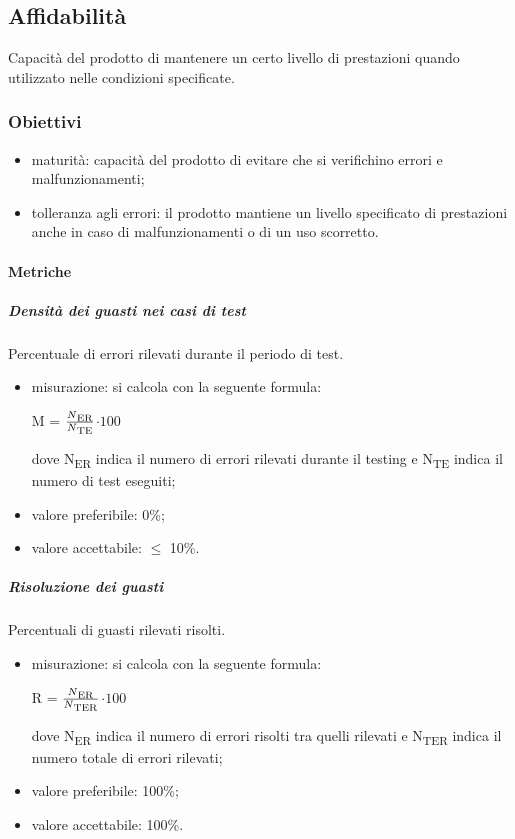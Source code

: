 	\subsection{Affidabilità}
	Capacità del prodotto di mantenere un certo livello di prestazioni quando utilizzato nelle condizioni specificate.
		\subsubsection{Obiettivi}
		\begin{itemize}
			\item maturità: capacità del prodotto di evitare che si verifichino errori e malfunzionamenti;
			\item tolleranza agli errori: il prodotto mantiene un livello specificato di prestazioni anche in caso di malfunzionamenti o di un uso scorretto.
		\end{itemize}
		\paragraph{Metriche}
			\subparagraph{Densità dei guasti nei casi di test}
			Percentuale di errori rilevati durante il periodo di test.
			\begin{itemize}
			\item misurazione: si calcola con la seguente formula: \\
			\centerline{ M =  \(\frac{N\textsubscript{ER}}{N\textsubscript{TE}} \)$ \cdot 100$ }
			dove N\textsubscript{ER} indica il numero di errori rilevati durante il testing e N\textsubscript{TE} indica il numero di test eseguiti;
			\item valore preferibile: 0\%;
			\item valore accettabile: $\leq$ 10\%.
			\end{itemize}
			\subparagraph{Risoluzione dei guasti}
			Percentuali di guasti rilevati risolti.
			\begin{itemize}
			\item misurazione: si calcola con la seguente formula: \\
			\centerline{ R =  \(\frac{N\textsubscript{ER}}{N\textsubscript{TER}} \)$ \cdot 100$ }
			dove N\textsubscript{ER} indica il numero di errori risolti tra quelli rilevati e N\textsubscript{TER} indica il numero totale di errori rilevati;
			\item valore preferibile: 100\%;
			\item valore accettabile: 100\%.
			\end{itemize}
